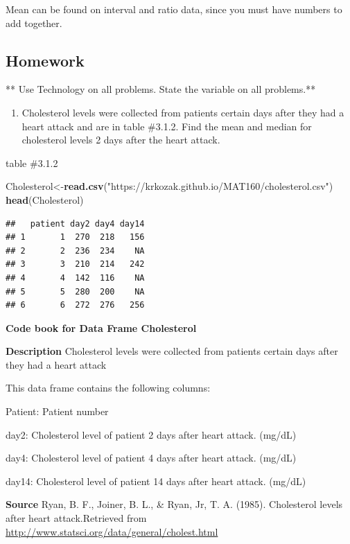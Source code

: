 \documentclass[]{book}
\newenvironment{Shaded}{\begin{snugshade}}{\end{snugshade}}
\newcommand{\KeywordTok}[1]{\textcolor[rgb]{0.13,0.29,0.53}{\textbf{#1}}}
\newcommand{\NormalTok}[1]{#1}
\newcommand{\StringTok}[1]{\textcolor[rgb]{0.31,0.60,0.02}{#1}}
\providecommand{\tightlist}{%
  \setlength{\itemsep}{0pt}\setlength{\parskip}{0pt}}
\begin{document}
Mean can be found on interval and ratio data, since you must have numbers to add together.

\hypertarget{homework-7}{%
\subsection{Homework}\label{homework-7}}

** Use Technology on all problems. State the variable on all problems.**

\begin{enumerate}
\def\labelenumi{\arabic{enumi}.}
\tightlist
\item
  Cholesterol levels were collected from patients certain days after they had a heart attack and are in table \#3.1.2. Find the mean and median for cholesterol levels 2 days after the heart attack.
\end{enumerate}

table \#3.1.2

\begin{Shaded}
\begin{Highlighting}[]
\NormalTok{Cholesterol<-}\KeywordTok{read.csv}\NormalTok{(}\StringTok{"https://krkozak.github.io/MAT160/cholesterol.csv"}\NormalTok{)}
\KeywordTok{head}\NormalTok{(Cholesterol)}
\end{Highlighting}
\end{Shaded}

\begin{verbatim}
##   patient day2 day4 day14
## 1       1  270  218   156
## 2       2  236  234    NA
## 3       3  210  214   242
## 4       4  142  116    NA
## 5       5  280  200    NA
## 6       6  272  276   256
\end{verbatim}

\textbf{Code book for Data Frame Cholesterol}

\textbf{Description}
Cholesterol levels were collected from patients certain days after they had a heart attack

This data frame contains the following columns:

Patient: Patient number

day2: Cholesterol level of patient 2 days after heart attack. (mg/dL)

day4: Cholesterol level of patient 4 days after heart attack. (mg/dL)

day14: Cholesterol level of patient 14 days after heart attack. (mg/dL)

\textbf{Source}
Ryan, B. F., Joiner, B. L., \& Ryan, Jr, T. A. (1985). Cholesterol levels after heart attack.Retrieved from \url{http://www.statsci.org/data/general/cholest.html}
\end{document}
